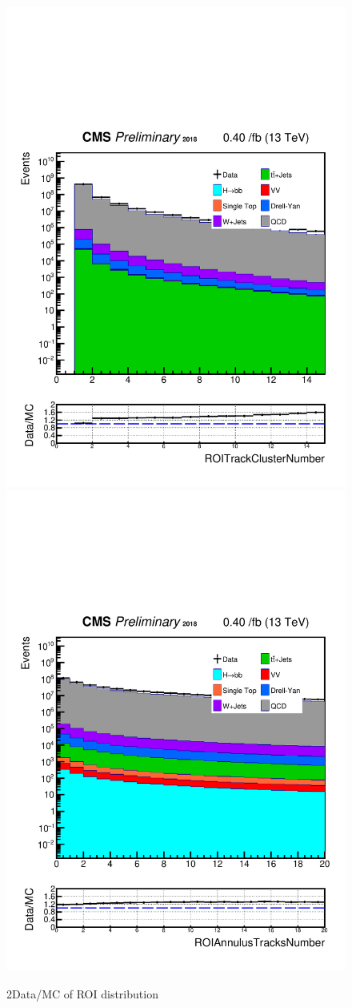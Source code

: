 \begin{figure}[h!]
  \caption{2Data/MC of ROI distribution}
  \label{fig:2ROIs}
  \centering
  \includegraphics[width=0.47\linewidth]{figs/Data_AnalysisNoteplot_MS-15_ctauS-10_ROITrackClusterNumber.pdf}
  \includegraphics[width=0.47\linewidth]{figs/Data_AnalysisNoteplot_MS-15_ctauS-10_ROIAnnulusTracksNumber.pdf}
\end{figure}
